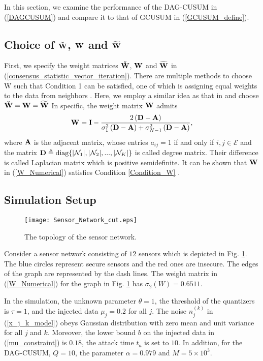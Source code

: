 \documentclass[11pt, draftclsnofoot, onecolumn]{IEEEtran}
\newcommand{\bW}{\bf{W}}
\newcommand{\cE}{\mathcal{E}}
\newcommand{\cN}{\mathcal{N}}
\newcommand{\cW}{{\check{W}}}
\newcommand{\tW}{{\widetilde{W}}}
\begin{document}
In this section, we examine the performance of the DAG-CUSUM in (\ref{DAGCUSUM}) and compare it to that of GCUSUM in (\ref{GCUSUM_define}). 

\subsection{Choice of $\bf \cW$, $\bW$ and $\bf \tW$}

First, we specify the weight matrices $\bf \cW$, $\bW$ and $\bf \tW$ in (\ref{consensus_statistic_vector_iteration}). There are multiple
methods to choose W such that Condition 1 can be satisfied, one of which is assigning equal
weights to the data from neighbors \cite{xiao2004fast}. Here, we employ a similar idea as that in \cite{xiao2004fast} and choose
${\bf \cW} =\bW = {\bf \tW}$ 
In specific, the weight matrix $\bW$ admits
\begin{equation} \label{W_Numerical}
{\bf{W}} = {\bf{I}} -\frac{2\left( {{\bf{D}} - {\bf{A}}} \right)}{ \sigma _1^2\left( {{\bf{D}} - {\bf{A}}} \right) + \sigma _{N - 1}^2\left( {{\bf{D}} - {\bf{A}}} \right)} ,
\end{equation}
where ${\bf{A}}$ is the adjacent matrix, whose entries $a_{ij} = 1$ if and only if ${i, j} \in \cE$ and the matrix ${\bf D} \triangleq {\text{diag}}\{|\cN_1|, |\cN_2|, . . . , |\cN_K|\}$ is called degree matrix. Their difference is called Laplacian matrix which is positive semidefinite. It can be shown that $\bW$ in (\ref{W_Numerical}) satisfies Condition \ref{Condition_W} \cite{xiao2004fast}.

\subsection{Simulation Setup}

\begin{figure}[htb]
	\centerline{
		\texttt{[image: Sensor\_Network\_cut.eps]}
	}
	\caption{The topology of the sensor network.}		
	\label{Fig_Sensor_Network}	
\end{figure}

Consider a sensor network consisting of $12$ sensors which is depicted in Fig. \ref{Fig_Sensor_Network}. The blue circles represent secure sensors and the red ones are insecure. The edges of the graph are represented by the dash lines. The weight matrix in (\ref{W_Numerical}) for the graph in Fig. \ref{Fig_Sensor_Network} has $\sigma_2(W)=0.6511$. 

In the simulation, the unknown parameter $\theta = 1$, the threshold of the quantizers is $\tau=1$, and the injected data $\mu_j = 0.2$ for all $j$. The noise $n_j^{(k)}$ in (\ref{x_j_k_model}) obeys Gaussian distribution with zero mean and unit variance for all $j$ and $k$.  Moreover, the lower bound $b$ on the injected data in (\ref{mu_constraint}) is $0.18$,  the attack time $t_a$ is set to $10$. In addition, for the DAG-CUSUM, $Q=10$, the parameter $\alpha = 0.979$ and   $M=5 \times 10^3$.  
\end{document}
